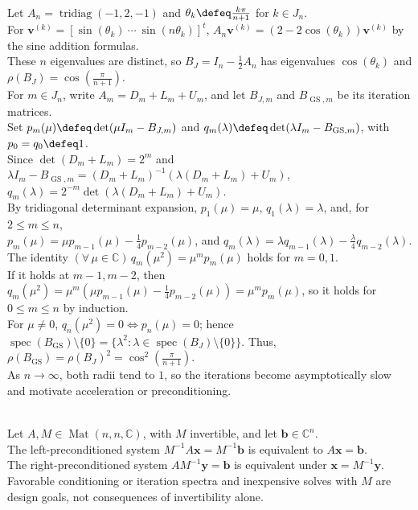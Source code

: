 \begin{example} \label{ex:poisson-tridiagonal-stationary-rates} \\
Let $A_n=\operatorname{tridiag}(-1,2,-1)$ and $\theta_k\defeq\frac{k\pi}{n+1}$ for $k\in J_n$.\\
For $\mathbf{v}^{(k)}=[\sin(\theta_k)\ \cdots\ \sin(n\theta_k)]^t$, $A_n\mathbf{v}^{(k)}=(2-2\cos(\theta_k))\mathbf{v}^{(k)}$ by the sine addition formulas.\\
These $n$ eigenvalues are distinct, so $B_J=I_n-\frac{1}{2}A_n$ has eigenvalues $\cos(\theta_k)$ and $\rho(B_J)=\cos\left(\frac{\pi}{n+1}\right)$.\\
For $m\in J_n$, write $A_m=D_m+L_m+U_m$, and let $B_{J,m}$ and $B_{\operatorname{GS},m}$ be its iteration matrices.\\
Set $p_m(\mu)\defeq\det(\mu I_m-B_{J,m})$ and $q_m(\lambda)\defeq\det(\lambda I_m-B_{\operatorname{GS},m})$, with $p_0=q_0\defeq1$.\\
Since $\det(D_m+L_m)=2^m$ and $\lambda I_m-B_{\operatorname{GS},m}=(D_m+L_m)^{-1}(\lambda(D_m+L_m)+U_m)$, $q_m(\lambda)=2^{-m}\det(\lambda(D_m+L_m)+U_m)$.\\
By tridiagonal determinant expansion, $p_1(\mu)=\mu$, $q_1(\lambda)=\lambda$, and, for $2\leq m\leq n$,\\
$p_m(\mu)=\mu p_{m-1}(\mu)-\frac{1}{4}p_{m-2}(\mu)$, and $q_m(\lambda)=\lambda q_{m-1}(\lambda)-\frac{\lambda}{4}q_{m-2}(\lambda)$. The identity $(\forall\,\mu\in\mathbb{C})\,q_m(\mu^2)=\mu^mp_m(\mu)$ holds for $m=0,1$.\\
If it holds at $m-1,m-2$, then $q_m(\mu^2)=\mu^m(\mu p_{m-1}(\mu)-\frac{1}{4}p_{m-2}(\mu))=\mu^mp_m(\mu)$, so it holds for $0\leq m\leq n$ by induction.\\
For $\mu\neq0$, $q_n(\mu^2)=0\Longleftrightarrow p_n(\mu)=0$; hence $\operatorname{spec}(B_{\operatorname{GS}})\setminus\{0\}=\{\lambda^2:\lambda\in\operatorname{spec}(B_J)\setminus\{0\}\}$. Thus, $\rho(B_{\operatorname{GS}})=\rho(B_J)^2=\cos^2\left(\frac{\pi}{n+1}\right)$.\\
As $n\to\infty$, both radii tend to $1$, so the iterations become asymptotically slow and motivate acceleration or preconditioning.
\end{example}

\begin{perspective} \label{per:preconditioning-preview} \\
Let $A,M\in\operatorname{Mat}(n,n,\mathbb{C})$, with $M$ invertible, and let $\mathbf{b}\in\mathbb{C}^n$.\\
The left-preconditioned system $M^{-1}A\mathbf{x}=M^{-1}\mathbf{b}$ is equivalent to $A\mathbf{x}=\mathbf{b}$.\\
The right-preconditioned system $AM^{-1}\mathbf{y}=\mathbf{b}$ is equivalent under $\mathbf{x}=M^{-1}\mathbf{y}$.\\
Favorable conditioning or iteration spectra and inexpensive solves with $M$ are design goals, not consequences of invertibility alone.
\end{perspective}
